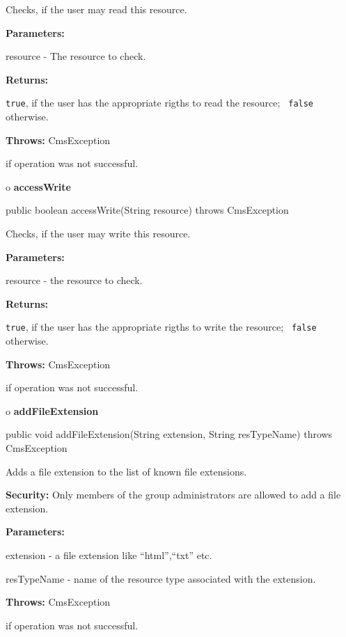 \begin{description}
\htmlDD Checks, if the user may read this resource.

\begin{description}
\item {\bf Parameters:}

resource - The resource to check.
\item {\bf Returns:}

{\tt true}, if the user has the appropriate rigths to read the resource; {\tt
false} otherwise.
\item {\bf Throws:} CmsException

if operation was not successful.
\end{description}

\end{description}

o {\bf accessWrite}

\begin{PRE}
 public boolean accessWrite(String resource) throws CmsException
\end{PRE}

\begin{description}
\htmlDD Checks, if the user may write this resource.

\begin{description}
\item {\bf Parameters:}

resource - the resource to check.
\item {\bf Returns:}

{\tt true}, if the user has the appropriate rigths to write the resource; {\tt
false} otherwise.
\item {\bf Throws:} CmsException

if operation was not successful.
\end{description}

\end{description}

o {\bf addFileExtension}

\begin{PRE}
 public void addFileExtension(String extension,
                              String resTypeName) throws CmsException
\end{PRE}

\begin{description}
\htmlDD Adds a file extension to the list of known file extensions.

{\bf Security:} Only members of the group administrators are allowed to add a
file extension.

\begin{description}
\item {\bf Parameters:}

extension - a file extension like ``html'',``txt'' etc.

resTypeName - name of the resource type associated with the extension.
\item {\bf Throws:} CmsException

if operation was not successful.
\end{description}

\end{description}

